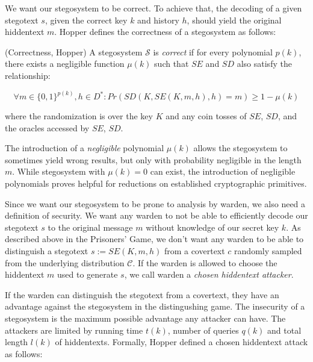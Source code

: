 \documentclass[english,version-2020-11]{uzl-thesis}
\begin{document}
We want our stegosystem to be correct.
To achieve that, the decoding of a given stegotext $s$, given the correct key $k$ and history $h$, should yield the original hiddentext $m$.
Hopper defines the correctness of a stegosystem as follows:

\begin{definition}
(Correctness, Hopper) A stegosystem $\mathcal{S}$ is \emph{correct} if for every polynomial $p(k)$, there exists a negligible function $\mu(k)$ such that $SE$ and $SD$ also satisfy the relationship:

$$\forall m \in \{0,1\}^{p(k)}, h \in D^* \colon Pr(SD(K, SE(K, m, h), h) = m) \geq 1 - \mu(k)$$

where the randomization is over the key $K$ and any coin tosses of $SE$, $SD$, and the oracles accessed by $SE$, $SD$.
\end{definition}

The introduction of a \emph{negligible} polynomial $\mu(k)$ allows the stegosystem to sometimes yield wrong results, but only with probability negligible in the length $m$.
While stegosystem with $\mu(k) = 0$ can exist, the introduction of negligible polynomials proves helpful for reductions on established cryptographic primitives. 

Since we want our stegosystem to be prone to analysis by warden, we also need a definition of security.
We want any warden to not be able to efficiently decode our stegotext $s$ to the original message $m$ without knowledge of our secret key $k$.
As described above in the Prisoners' Game, we don't want any warden to be able to distinguish a stegotext $s := SE(K, m, h)$ from a covertext $c$ randomly sampled from the underlying distribution $\mathcal{C}$.
If the warden is allowed to choose the hiddentext $m$ used to generate $s$, we call warden a \emph{chosen hiddentext attacker}. 

If the warden can distinguish the stegotext from a covertext, they have an advantage against the stegosystem in the distingushing game.
The insecurity of a stegosystem is the maximum possible advantage any attacker can have.
The attackers are limited by running time $t(k)$, number of queries $q(k)$ and total length $l(k)$ of hiddentexts.
Formally, Hopper defined a chosen hiddentext attack as follows:
\end{document}
